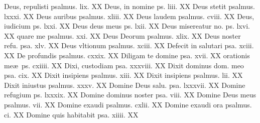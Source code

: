 \documentclass[a5paper,10pt]{book}
\def\ae{æ}
\begin{document}
\begin{multicols}{2}
\newline Deus, repulisti psalmus. lix. \hfill XX
\newline Deus, in nomine ps. liii. \hfill XX
\newline Deus stetit psalmus. lxxxi. \hfill XX
\newline Deus auribus psalmus. xliii. \hfill XX
\newline Deus laudem psalmus. cviii. \hfill XX
\newline Deus, iudicium ps. lxxi. \hfill XX
\newline Deus deus meus ps. lxii. \hfill XX
\newline Deus misereatur no. ps. lxvi. \hfill XX
\newline \indent quare me psalmus. xxi. \hfill XX
\newline Deus Deorum psalmus. xlix. \hfill XX
\newline Deus noster refu. psa. xlv. \hfill XX
\newline Deus vltionum psalmus. xciii. \hfill XX
\newline Defecit in salutari psa. xciii. \hfill XX
\newline De profundis psalmus. cxxix. \hfill XX
\newline Diligam te domine psa. xvii. \hfill XX
\newline \indent orationis me\ae \ ps. cxiiii. \hfill XX
\newline Dixi, custodiam psa. xxxviii. \hfill XX
\newline Dixit dominus dom. meo psa. cix. \hfill XX
\newline Dixit insipiens psalmus. xiii. \hfill XX
\newline Dixit insipiens psalmus. lii. \hfill XX
\newline Dixit iniustus psalmus. xxxv. \hfill XX
\newline Domine Deus salu. psa. lxxxvii. \hfill XX
\newline Domine refugium ps. lxxxix. \hfill XX
\newline Domine dominus noster psa. viii. \hfill XX
\newline Domine Deus meus psalmus. vii. \hfill XX
\newline Domine exaudi psalmus. cxlii. \hfill XX
\newline Domine exaudi ora psalmus. ci. \hfill XX
\newline Domine quis habitabit psa. xiiii. \hfill XX

\end{multicols}
\end{document}

